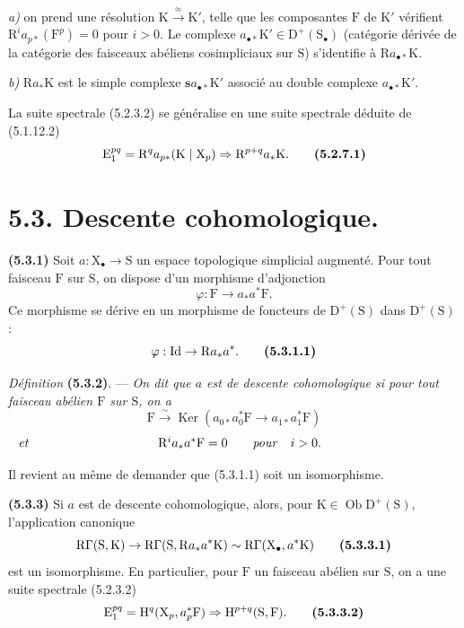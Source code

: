 \documentclass[11pt,leqno]{article}
\begin{document}
\textit{a)} on prend une résolution \(\mathrm{K}\xrightarrow{\approx}\mathrm{K}'\), telle que les composantes \(\mathrm{F}\) de \(\mathrm{K}'\) vérifient \(\mathrm{R}^{i}a_{p*}(\mathrm{F}^{p})=0\) pour \(i>0\). Le complexe \(a_{\bullet *}\mathrm{K}'\in\mathrm{D}^{+}(\mathrm{S}_{\bullet})\) (catégorie dérivée de la catégorie des faisceaux abéliens cosimpliciaux sur \(\mathrm{S}\)) s’identifie à \(\mathrm{R}a_{\bullet *}\mathrm{K}\).

\textit{b)} \(\mathrm{R}a_*\mathrm{K}\) est le simple complexe \(\boldsymbol{s}a_{\bullet *}\mathrm{K}'\) associé au double complexe \(a_{\bullet *}\mathrm{K}'\).

La suite spectrale (5.2.3.2) se généralise en une suite spectrale déduite de (5.1.12.2)
\[
\mathrm{E}_{1}^{pq}=\mathrm{R}^{q}a_{p*}(\mathrm{K}\mid\mathrm{X}_{p})
\Rightarrow \mathrm{R}^{p+q}a_*\mathrm{K}.
\tag*{\textbf{(5.2.7.1)}}
\]

\section*{5.3. Descente cohomologique.}

\textbf{(5.3.1)} Soit \(a:\mathrm{X}_{\bullet}\to\mathrm{S}\) un espace topologique simplicial augmenté. Pour tout faisceau \(\mathrm{F}\) sur \(\mathrm{S}\), on dispose d’un morphisme d’adjonction
\[
\varphi:\mathrm{F}\to a_*a^*\mathrm{F}.
\]
Ce morphisme se dérive en un morphisme de foncteurs de \(\mathrm{D}^{+}(\mathrm{S})\) dans \(\mathrm{D}^{+}(\mathrm{S})\) :
\[
\varphi:\mathrm{Id}\to\mathrm{R}a_*a^*.
\tag*{\textbf{(5.3.1.1)}}
\]

\textit{Définition} \textbf{(5.3.2)}. — \textit{On dit que \(a\) est de \textup{descente cohomologique} si pour tout faisceau abélien \(\mathrm{F}\) sur \(\mathrm{S}\), on a}
\[
\mathrm{F}\xrightarrow{\sim}
\operatorname{Ker}(a_{0*}a_{0}^{*}\mathrm{F}\to a_{1*}a_{1}^{*}\mathrm{F})
\]
\[
\makebox[\linewidth]{\textit{et}\hfill
\(\mathrm{R}^{i}a_*a^*\mathrm{F}=0
\qquad\text{\textit{pour}}\quad i>0.\)\hfill}
\]

Il revient au même de demander que (5.3.1.1) soit un isomorphisme.

\textbf{(5.3.3)} Si \(a\) est de descente cohomologique, alors, pour \(\mathrm{K}\in\operatorname{Ob}\mathrm{D}^{+}(\mathrm{S})\), l’application canonique
\[
\mathrm{R}\Gamma(\mathrm{S},\mathrm{K})
\to\mathrm{R}\Gamma(\mathrm{S},\mathrm{R}a_*a^*\mathrm{K})
\sim\mathrm{R}\Gamma(\mathrm{X}_{\bullet},a^*\mathrm{K})
\tag*{\textbf{(5.3.3.1)}}
\]
est un isomorphisme. En particulier, pour \(\mathrm{F}\) un faisceau abélien sur \(\mathrm{S}\), on a une suite spectrale (5.2.3.2)
\[
\mathrm{E}_{1}^{pq}=\mathrm{H}^{q}(\mathrm{X}_{p},a_{p}^{*}\mathrm{F})
\Rightarrow\mathrm{H}^{p+q}(\mathrm{S},\mathrm{F}).
\tag*{\textbf{(5.3.3.2)}}
\]
\end{document}
